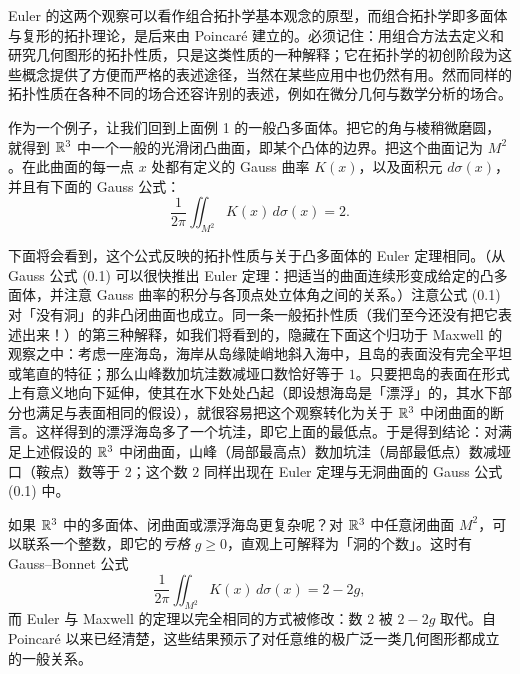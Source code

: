 
Euler 的这两个观察可以看作组合拓扑学基本观念的原型，而组合拓扑学即多面体与复形的拓扑理论，是后来由 Poincaré 建立的。必须记住：用组合方法去定义和研究几何图形的拓扑性质，只是这类性质的一种解释；它在拓扑学的初创阶段为这些概念提供了方便而严格的表述途径，当然在某些应用中也仍然有用。然而同样的拓扑性质在各种不同的场合还容许别的表述，例如在微分几何与数学分析的场合。

作为一个例子，让我们回到上面例 1 的一般凸多面体。把它的角与棱稍微磨圆，就得到 $\mathbb{R}^3$ 中一个一般的光滑闭凸曲面，即某个凸体的边界。把这个曲面记为 $M^2$。在此曲面的每一点 $x$ 处都有定义的 Gauss 曲率 $K(x)$，以及面积元 $d\sigma(x)$，并且有下面的 Gauss 公式：
\begin{equation}
\frac{1}{2\pi}\iint_{M^2}K(x)\,d\sigma(x)=2. \tag{0.1}
\end{equation}

下面将会看到，这个公式反映的拓扑性质与关于凸多面体的 Euler 定理相同。（从 Gauss 公式 (0.1) 可以很快推出 Euler 定理：把适当的曲面连续形变成给定的凸多面体，并注意 Gauss 曲率的积分与各顶点处立体角之间的关系。）注意公式 (0.1) 对「没有洞」的非凸闭曲面也成立。同一条一般拓扑性质（我们至今还没有把它表述出来！）的第三种解释，如我们将看到的，隐藏在下面这个归功于 Maxwell 的观察之中：考虑一座海岛，海岸从岛缘陡峭地斜入海中，且岛的表面没有完全平坦或笔直的特征；那么山峰数加坑洼数减垭口数恰好等于 $1$。只要把岛的表面在形式上有意义地向下延伸，使其在水下处处凸起（即设想海岛是「漂浮」的，其水下部分也满足与表面相同的假设），就很容易把这个观察转化为关于 $\mathbb{R}^3$ 中闭曲面的断言。这样得到的漂浮海岛多了一个坑洼，即它上面的最低点。于是得到结论：对满足上述假设的 $\mathbb{R}^3$ 中闭曲面，山峰（局部最高点）数加坑洼（局部最低点）数减垭口（鞍点）数等于 $2$；这个数 $2$ 同样出现在 Euler 定理与无洞曲面的 Gauss 公式 (0.1) 中。

如果 $\mathbb{R}^3$ 中的多面体、闭曲面或漂浮海岛更复杂呢？对 $\mathbb{R}^3$ 中任意闭曲面 $M^2$，可以联系一个整数，即它的\emph{亏格} $g\ge 0$，直观上可解释为「洞的个数」。这时有 Gauss--Bonnet 公式
\begin{equation}
\frac{1}{2\pi}\iint_{M^2}K(x)\,d\sigma(x)=2-2g, \tag{0.2}
\end{equation}
而 Euler 与 Maxwell 的定理以完全相同的方式被修改：数 $2$ 被 $2-2g$ 取代。自 Poincaré 以来已经清楚，这些结果预示了对任意维的极广泛一类几何图形都成立的一般关系。

